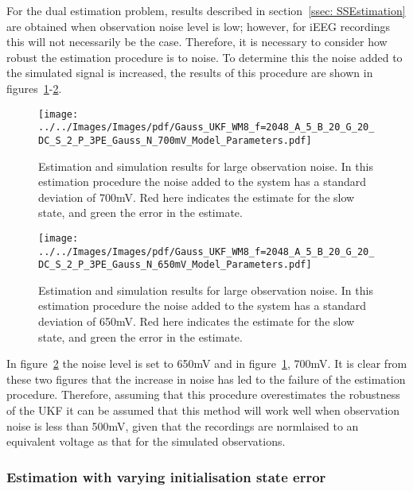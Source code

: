 For the dual estimation problem, results described in section~\ref{ssec: SSEstimation} are obtained when observation noise level is low; however, for iEEG recordings this will not necessarily be the case. Therefore, it is necessary to consider how robust the estimation procedure is to noise. To determine this the noise added to the simulated signal is increased, the results of this procedure are shown in figures~\ref{fig: ESTFail}-\ref{fig: ESTPass}.
\begin{figure}%
	\centering
		\texttt{[image: ../../Images/Images/pdf/Gauss\_UKF\_WM8\_f=2048\_A\_5\_B\_20\_G\_20\_DC\_S\_2\_P\_3PE\_Gauss\_N\_700mV\_Model\_Parameters.pdf]}
	\caption{Estimation and simulation results for large observation noise. In this estimation procedure the noise added to the system has a standard deviation of 700mV. Red here indicates the estimate for the slow state, and green the error in the estimate. }
	\label{fig: ESTFail}
\end{figure}
\begin{figure}
	\centering
		\texttt{[image: ../../Images/Images/pdf/Gauss\_UKF\_WM8\_f=2048\_A\_5\_B\_20\_G\_20\_DC\_S\_2\_P\_3PE\_Gauss\_N\_650mV\_Model\_Parameters.pdf]}
	\caption{Estimation and simulation results for large observation noise. In this estimation procedure the noise added to the system has a standard deviation of 650mV. Red here indicates the estimate for the slow state, and green the error in the estimate. }
	\label{fig: ESTPass}
\end{figure}%


In figure~\ref{fig: ESTPass} the noise level is set to 650mV and in figure~\ref{fig: ESTFail}, 700mV. It is clear from these two figures that the increase in noise has led to the failure of the estimation procedure. Therefore, assuming that this procedure overestimates the robustness of the UKF it can be assumed that this method will work well when observation noise is less than 500mV, given that the recordings are normlaised to an equivalent voltage as that for the simulated observations.

\subsubsection{Estimation with varying initialisation state error}

